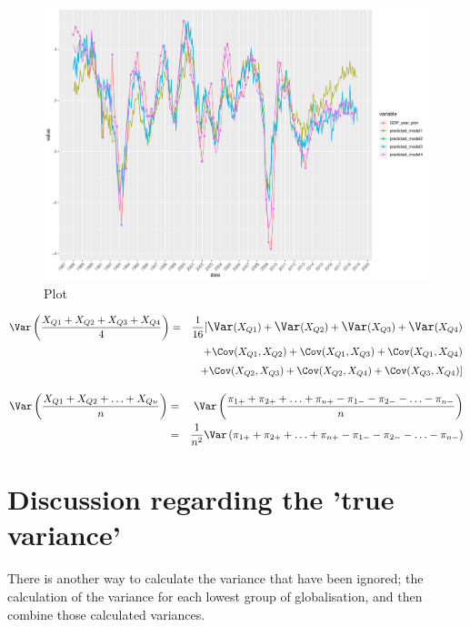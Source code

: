 \documentclass{article}[]
\begin{document}
\begin{figure}[H]
    \centering
    \includegraphics[scale=0.5]{Graphs/pred2.pdf}
    \caption{Plot }
    \label{pred2}
\end{figure}

\begin{eqnarray}
    \Var \left(\frac{X_{Q1} + X_{Q2} + X_{Q3} + X_{Q4}}{4} \right) &=& \frac{1}{16} \large[ \Var(X_{Q1}) + \Var(X_{Q2}) + \Var(X_{Q3}) + \Var(X_{Q4}) \nonumber \\
    && + \Cov (X_{Q1},X_{Q2}) + \Cov (X_{Q1},X_{Q3}) + \Cov (X_{Q1},X_{Q4}) \nonumber \\
    &&  + \Cov (X_{Q2},X_{Q3}) + \Cov (X_{Q2},X_{Q4}) + \Cov (X_{Q3},X_{Q4}) \large] \nonumber
\end{eqnarray}

\begin{eqnarray}
    \Var \left(\frac{X_{Q1} + X_{Q2} + \ldots + X_{Qn}}{n} \right) 
    &=& \Var \left(\frac{\pi_{1+} + \pi_{2+} + \ldots + \pi_{n+} - \pi_{1-} - \pi_{2-} - \ldots - \pi_{n-} }{n} \right) \nonumber \\
    &=& \frac{1}{n^2} \Var \left(\pi_{1+} + \pi_{2+} + \ldots + \pi_{n+} - \pi_{1-} - \pi_{2-} - \ldots - \pi_{n-} \right) \nonumber \\
\end{eqnarray}




\section{Discussion regarding the 'true variance'}

There is another way to calculate the variance that have been ignored; the calculation of the variance for each lowest group of globalisation, and then combine those calculated variances.
\end{document}
